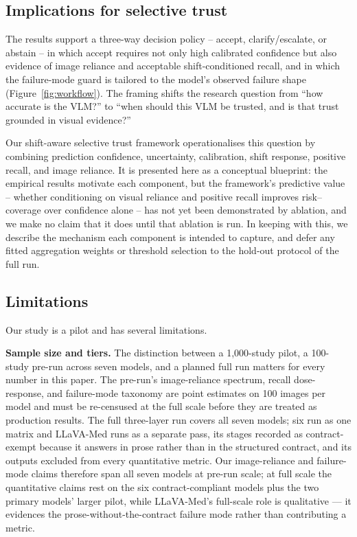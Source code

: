 \subsection{Implications for selective trust}

The results support a three-way decision policy -- accept, clarify/escalate, or abstain -- in which accept requires not only high calibrated confidence but also evidence of image reliance and acceptable shift-conditioned recall, and in which the failure-mode guard is tailored to the model's observed failure shape (Figure~\ref{fig:workflow}). The framing shifts the research question from ``how accurate is the VLM?'' to ``when should this VLM be trusted, and is that trust grounded in visual evidence?''

Our shift-aware selective trust framework operationalises this question by combining prediction confidence, uncertainty, calibration, shift response, positive recall, and image reliance. It is presented here as a conceptual blueprint: the empirical results motivate each component, but the framework's predictive value -- whether conditioning on visual reliance and positive recall improves risk--coverage over confidence alone -- has not yet been demonstrated by ablation, and we make no claim that it does until that ablation is run. In keeping with this, we describe the mechanism each component is intended to capture, and defer any fitted aggregation weights or threshold selection to the hold-out protocol of the full run.

\subsection{Limitations}

Our study is a pilot and has several limitations.

\textbf{Sample size and tiers.} The distinction between a 1,000-study pilot, a
100-study pre-run across seven models, and a planned full run matters for every
number in this paper. The pre-run's image-reliance spectrum, recall dose-response,
and failure-mode taxonomy are point estimates on 100 images per model and must be
re-censused at the full scale before they are treated as production results. The
full three-layer run covers all seven models; six run as one matrix and LLaVA-Med
runs as a separate pass, its stages recorded as contract-exempt because it answers
in prose rather than in the structured contract, and its outputs excluded from every
quantitative metric. Our image-reliance and failure-mode claims therefore span all
seven models at pre-run scale; at full scale the quantitative claims rest on the six
contract-compliant models plus the two primary models' larger pilot, while
LLaVA-Med's full-scale role is qualitative --- it evidences the
prose-without-the-contract failure mode rather than contributing a metric.


